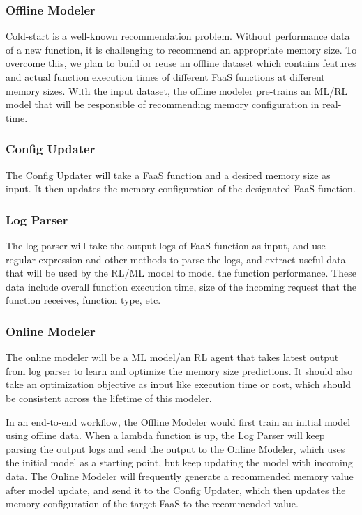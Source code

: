 \documentclass[conference]{IEEEtran}
\begin{document}
\subsubsection{Offline Modeler}
Cold-start is a well-known recommendation problem. Without performance data of a new function, it is challenging to recommend an appropriate memory size. To overcome this, we plan to build or reuse an offline dataset which contains features and actual function execution times of different FaaS functions at different memory sizes. With the input dataset, the offline modeler pre-trains an ML/RL model that will be responsible of recommending memory configuration in real-time. 

\subsubsection{Config Updater}
The Config Updater will take a FaaS function and a desired memory size as input. It then updates the memory configuration of the designated FaaS function.
\subsubsection{Log Parser}
The log parser will take the output logs of FaaS function as input, and use regular expression and other methods to parse the logs, and extract useful data that will be used by the RL/ML model to model the function performance. These data include overall function execution time, size of the incoming request that the function receives, function type, etc.
\subsubsection{Online Modeler}
The online modeler will be a ML model/an RL agent that takes latest output from log parser to learn and optimize the memory size predictions. It should also take an optimization objective as input like execution time or cost, which should be consistent across the lifetime of this modeler.

In an end-to-end workflow, the Offline Modeler would first train an initial model using offline data. When a lambda function is up, the Log Parser will keep parsing the output logs and send the output to the Online Modeler, which uses the initial model as a starting point, but keep updating the model with incoming data. The Online Modeler will frequently generate a recommended memory value after model update, and send it to the Config Updater, which then updates the memory configuration of the target FaaS to the recommended value.
\end{document}
